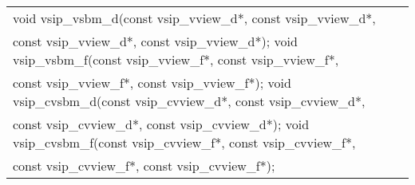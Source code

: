 \\\cvsiplh
\afh
{
\ttfamily
\\\hspace*{.04\textwidth}\begin{tabular}[H]{l}
void vsip\_vsbm\_d(const vsip\_vview\_d*, const vsip\_vview\_d*,\\*\hspace{.7cm}const vsip\_vview\_d*, const vsip\_vview\_d*); 
void vsip\_vsbm\_f(const vsip\_vview\_f*, const vsip\_vview\_f*,\\*\hspace{.7cm}const vsip\_vview\_f*, const vsip\_vview\_f*); 
void vsip\_cvsbm\_d(const vsip\_cvview\_d*, const vsip\_cvview\_d*,\\*\hspace{.7cm}const vsip\_cvview\_d*, const vsip\_cvview\_d*); 
void vsip\_cvsbm\_f(const vsip\_cvview\_f*, const vsip\_cvview\_f*,\\*\hspace{.7cm}const vsip\_cvview\_f*, const vsip\_cvview\_f*); 
\end{tabular}
}
\\\pyjvsiph
{}

